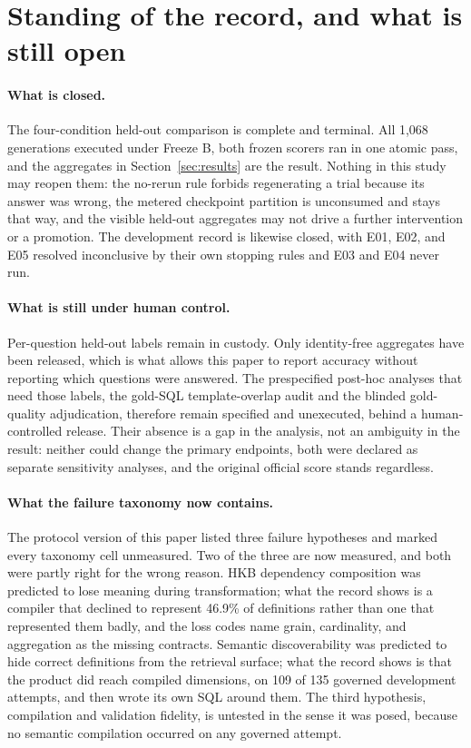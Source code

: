 \section{Standing of the record, and what is still open}
\label{sec:status}

\paragraph{What is closed.}
The four-condition held-out comparison is complete and terminal. All 1,068
generations executed under Freeze B, both frozen scorers ran in one atomic pass,
and the aggregates in Section~\ref{sec:results} are the result. Nothing in this
study may reopen them: the no-rerun rule forbids regenerating a trial because its
answer was wrong, the metered checkpoint partition is unconsumed and stays that
way, and the visible held-out aggregates may not drive a further intervention or
a promotion. The development record is likewise closed, with E01, E02, and E05
resolved inconclusive by their own stopping rules and E03 and E04 never run.

\paragraph{What is still under human control.}
Per-question held-out labels remain in custody. Only identity-free aggregates
have been released, which is what allows this paper to report accuracy without
reporting which questions were answered. The prespecified post-hoc analyses that
need those labels, the gold-SQL template-overlap audit and the blinded
gold-quality adjudication, therefore remain specified and unexecuted, behind a
human-controlled release. Their absence is a gap in the analysis, not an ambiguity
in the result: neither could change the primary endpoints, both were declared as
separate sensitivity analyses, and the original official score stands regardless.

\paragraph{What the failure taxonomy now contains.}
The protocol version of this paper listed three failure hypotheses and marked
every taxonomy cell unmeasured. Two of the three are now measured, and both were
partly right for the wrong reason. HKB dependency composition was predicted to
lose meaning during transformation; what the record shows is a compiler that
declined to represent 46.9\% of definitions rather than one that represented them
badly, and the loss codes name grain, cardinality, and aggregation as the missing
contracts. Semantic discoverability was predicted to hide correct definitions
from the retrieval surface; what the record shows is that the product did reach
compiled dimensions, on 109 of 135 governed development attempts, and then wrote
its own SQL around them. The third hypothesis, compilation and validation
fidelity, is untested in the sense it was posed, because no semantic compilation
occurred on any governed attempt.

